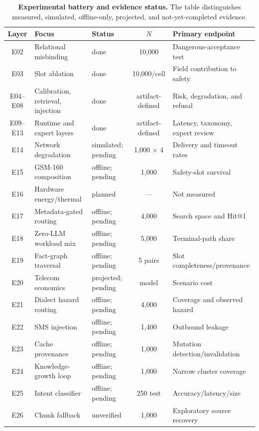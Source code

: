 \documentclass[11pt,a4paper]{article}
\begin{document}
\begin{table}[t]
\centering
\scriptsize
\caption{\textbf{Experimental battery and evidence status.} The table distinguishes measured, simulated, offline-only, projected, and not-yet-completed evidence.}
\label{tab:battery}
\begin{tabularx}{\textwidth}{@{} c L{3.0cm} L{1.7cm} c Y @{}}
\toprule
\textbf{Layer} & \textbf{Focus} & \textbf{Status} & \textbf{$N$} & \textbf{Primary endpoint} \\
\midrule
E02 & Relational misbinding & done & 10{,}000 & Dangerous-acceptance test \\
E03 & Slot ablation & done & 10{,}000/cell & Field contribution to safety \\
E04--E08 & Calibration, retrieval, injection & done & artifact-defined & Risk, degradation, and refusal \\
E09--E13 & Runtime and expert layers & done & artifact-defined & Latency, taxonomy, expert review \\
E14 & Network degradation & simulated; pending & 1{,}000 $\times$ 4 & Delivery and timeout rates \\
E15 & GSM-160 composition & offline; pending & 1{,}000 & Safety-slot survival \\
E16 & Hardware energy/thermal & planned & --- & Not measured \\
E17 & Metadata-gated routing & offline; pending & 4{,}000 & Search space and Hit@1 \\
E18 & Zero-LLM workload mix & offline; pending & 5{,}000 & Terminal-path share \\
E19 & Fact-graph traversal & offline; pending & 5 pairs & Slot completeness/provenance \\
E20 & Telecom economics & projected; pending & model & Scenario cost \\
E21 & Dialect hazard routing & offline; pending & 4{,}000 & Coverage and observed hazard \\
E22 & SMS injection & offline; pending & 1{,}400 & Outbound leakage \\
E23 & Cache provenance & offline; pending & 1{,}000 & Mutation detection/invalidation \\
E24 & Knowledge-growth loop & offline; pending & 1{,}000 & Narrow cluster coverage \\
E25 & Intent classifier & offline; pending & 250 test & Accuracy/latency/size \\
E26 & Chunk fallback & unverified & 1{,}000 & Exploratory source recovery \\
\bottomrule
\end{tabularx}
\vspace{-0.5em}
\end{table}
\end{document}
